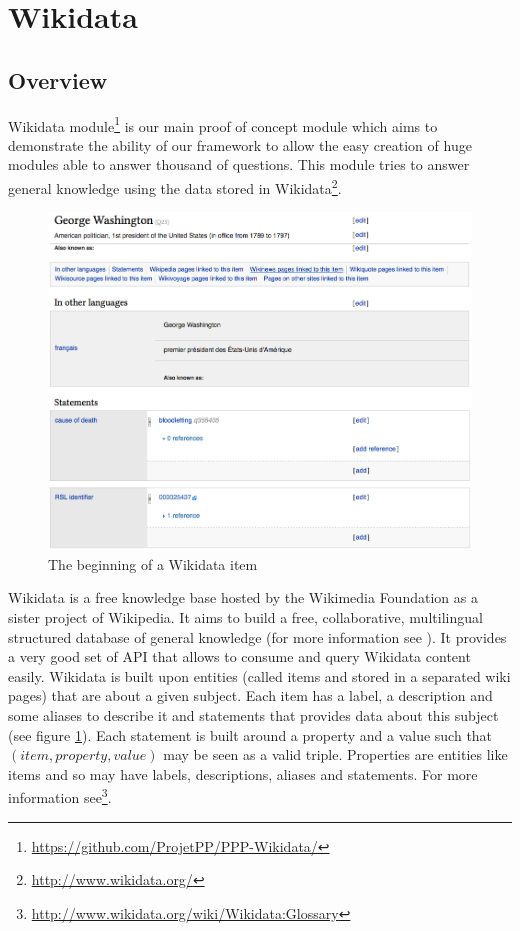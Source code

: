 \section{Wikidata}

\subsection{Overview}
Wikidata module\footnote{\url{https://github.com/ProjetPP/PPP-Wikidata/}} is our main proof of concept module which aims to demonstrate the ability of our framework to allow the easy creation of huge modules able to answer thousand of questions. This module tries to answer general knowledge using the data stored in Wikidata\footnote{\url{http://www.wikidata.org/}}.

\begin{figure}[!ht]
  \centering
    \label{wikidata:item-screenshot}
    \includegraphics[width=\textwidth]{./wikidata-item-screenshot.png}
    \caption{The beginning of a Wikidata item}
\end{figure}

Wikidata is a free knowledge base hosted by the Wikimedia Foundation as a sister project of Wikipedia. It aims to build a free, collaborative, multilingual structured database of general knowledge (for more information see \cite{42240}). It provides a very good set of API that allows to consume and query Wikidata content easily. Wikidata is built upon entities (called items and stored in a separated wiki pages) that are about a given subject. Each item has a label, a description and some aliases to describe it and statements that provides data about this subject (see figure \ref{wikidata:item-screenshot}). Each statement is built around a property and a value such that $(item, property, value)$ may be seen as a valid triple. Properties are entities like items and so may have labels, descriptions, aliases and statements. For more information see\footnote{\url{http://www.wikidata.org/wiki/Wikidata:Glossary}}.

